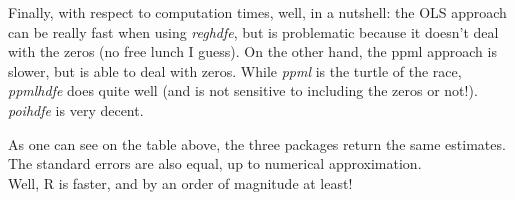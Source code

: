 \documentclass[10pt, final]{article}
\begin{document}
Finally, with respect to computation times, well, in a nutshell: the OLS approach can be really fast when using \textit{reghdfe}, but is problematic because it doesn't deal with the zeros (no free lunch I guess). On the other hand, the ppml approach is slower, but is able to deal with zeros. While \textit{ppml} is the turtle of the race, \textit{ppmlhdfe} does quite well (and is not sensitive to including the zeros or not!). \textit{poihdfe} is very decent.



\newpage

As one can see on the table above, the three packages return the same estimates. The standard errors are also equal, up to numerical approximation.
\\
Well, R is faster, and by an order of magnitude at least!



\end{document}

